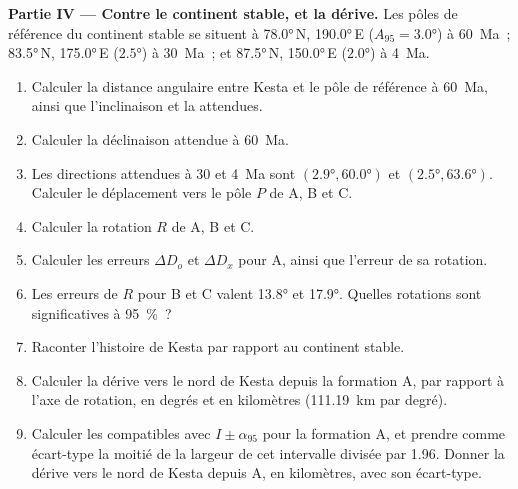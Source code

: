 \begin{problem}
\medskip\noindent\textbf{Partie IV --- Contre le continent stable, et la dérive.} Les
pôles de référence du continent stable se situent à \ang{78.0}\,N, \ang{190.0}\,E
($A_{95} = \ang{3.0}$) à \qty{60}{Ma}~; \ang{83.5}\,N, \ang{175.0}\,E
($\ang{2.5}$) à \qty{30}{Ma}~; et \ang{87.5}\,N, \ang{150.0}\,E ($\ang{2.0}$)
à \qty{4}{Ma}.
\begin{enumerate}[resume]
  \item Calculer la distance angulaire entre Kesta et le pôle de référence
        à \qty{60}{Ma}, ainsi que l'inclinaison et la  attendues.
  \item Calculer la déclinaison attendue à \qty{60}{Ma}.
  \item Les directions attendues à 30 et \qty{4}{Ma} sont $(\ang{2.9},
        \ang{60.0})$ et $(\ang{2.5}, \ang{63.6})$. Calculer le déplacement vers le
        pôle $P$ de A, B et C.
  \item Calculer la rotation $R$ de A, B et C.
  \item Calculer les erreurs $\Delta D_o$ et $\Delta D_x$ pour A, ainsi que l'erreur
        de sa rotation.
  \item Les erreurs de $R$ pour B et C valent \ang{13.8} et \ang{17.9}. Quelles
        rotations sont significatives à \qty{95}{\percent}~?
  \item Raconter l'histoire de Kesta par rapport au continent stable.
  \item Calculer la dérive vers le nord de Kesta depuis la formation A, par rapport à
        l'axe de rotation, en degrés et en kilomètres
        (\qty{111.19}{km} par degré).
  \item Calculer les  compatibles avec $I \pm \alpha_{95}$ pour
        la formation A, et prendre comme écart-type la moitié de la largeur de
        cet intervalle divisée par 1.96. Donner la dérive vers le nord de Kesta depuis
        A, en kilomètres, avec son écart-type.
\end{enumerate}
\end{problem}
